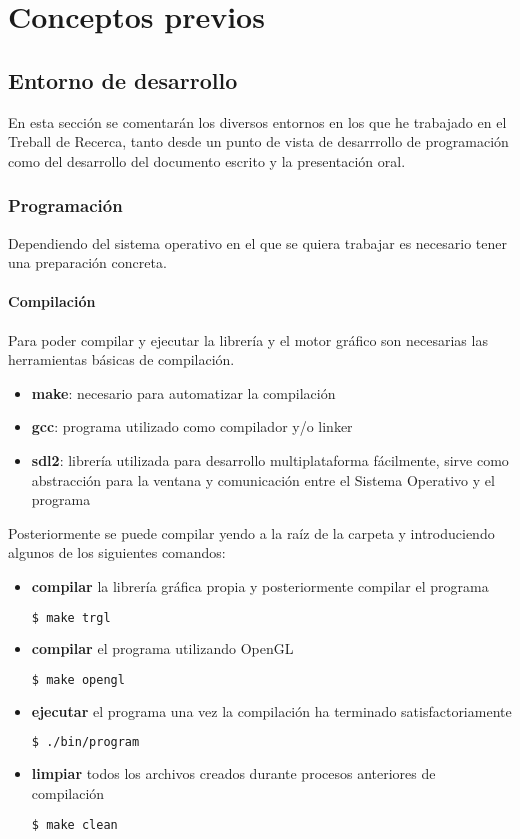 \chapter{Conceptos previos}
\section{Entorno de desarrollo}
En esta sección se comentarán los diversos entornos en los que he trabajado en el Treball de Recerca, tanto desde un punto de vista de desarrrollo de programación como del desarrollo del documento escrito y la presentación oral.
\subsection{Programación}
Dependiendo del sistema operativo en el que se quiera trabajar es necesario tener una preparación concreta.

\subsubsection{Compilación}
Para poder compilar y ejecutar la librería y el motor gráfico son necesarias las herramientas básicas de compilación.
\begin{itemize}
\item{\textbf{make}: necesario para automatizar la compilación}
\item{\textbf{gcc}: programa utilizado como compilador y/o linker}
\item{\textbf{sdl2}: librería utilizada para desarrollo multiplataforma fácilmente, sirve como abstracción para la ventana y comunicación entre el Sistema Operativo y el programa}
\end{itemize}

Posteriormente se puede compilar yendo a la raíz de la carpeta y introduciendo algunos de los siguientes comandos:

\begin{itemize}
\item{\textbf{compilar} la librería gráfica propia y posteriormente compilar el programa}
\begin{lstlisting}[language=bash]
  $ make trgl
\end{lstlisting}
\item{\textbf{compilar} el programa utilizando OpenGL}
\begin{lstlisting}[language=bash]
  $ make opengl
\end{lstlisting}
\item{\textbf{ejecutar} el programa una vez la compilación ha terminado satisfactoriamente}
\begin{lstlisting}[language=bash]
  $ ./bin/program
\end{lstlisting}
\item{\textbf{limpiar} todos los archivos creados durante procesos anteriores de compilación}
\begin{lstlisting}[language=bash]
  $ make clean
\end{lstlisting}
\end{itemize}

